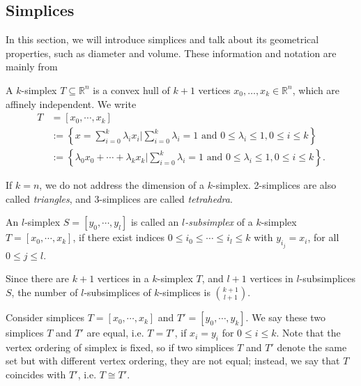     \subsection{Simplices}
    In this section, we will introduce simplices and talk about its geometrical properties, such as diameter and volume. These information and notation are mainly from \cite{ciarlet2002finite}\cite{bey2000simplicial}
    \noindent
    \begin{definition}
    A $k$-simplex $T \subseteq\mathbb{R}^n$ is a convex hull of $k+1$ vertices ${x}_0, \ldots, {x}_k \in \mathbb{R}^n$, which are affinely independent. We write 
    \begin{equation*}
    \begin{split}
    {T} & = [{x}_0, \cdots, {x}_k ]\\
    & := \left\{{x} = \sum\limits_{i=0}^k \lambda_i {x}_i \big| \sum\limits_{i=0}^k \lambda_i = 1 \text{ and } 0 \leqslant \lambda_i \leqslant 1, 0 \leqslant i \leqslant k \right\}\\
    & := \left\{\lambda_0{x}_0 + \cdots + \lambda_k{x}_k \big| \sum\limits_{i=0}^k \lambda_i = 1 \text{ and } 0 \leqslant \lambda_i \leqslant 1, 0 \leqslant i \leqslant k \right\}.
    \end{split}
    \end{equation*}
    \end{definition}
    If $k = n$, we do not address the dimension of a $k$-simplex. 2-simplices are also called \emph{triangles}, and 3-simplices are called \emph{tetrahedra}.

    \begin{definition}
    An  $l$-simplex ${S} = [{y}_0, \cdots, {y}_l]$ is called an \emph{$l$-subsimplex} of a $k$-simplex ${T} = [{x}_0, \cdots, {x}_k]$, if there exist indices $0 \leqslant {i}_0 \leqslant \cdots\leqslant{i}_l \leqslant k$ with ${y}_{i_{j}} = {x}_i$, for all $0 \leqslant j \leqslant l$.
    \end{definition}
    Since there are $k+1$ vertices in a $k$-simplex $T$, and $l+1$ vertices in $l$-subsimplices $S$, the number of $l$-subsimplices of $k$-simplices is $\binom{k+1}{l+1}$.


    Consider simplices $T = [{x}_0, \cdots, {x}_k]$ and $T' = [{y}_0, \cdots, {y}_k]$. We say these two simplices $T$ and $T'$ are equal, i.e. $T = T'$, if ${x}_i = {y}_i$ for $0 \leqslant i \leqslant k$. Note that the vertex ordering of simplex is fixed, so if two simplices $T$ and $T'$ denote the same set but with different vertex ordering, they are not equal; instead, we say that ${T}$ coincides with $T'$, i.e. $T \cong T'$.

